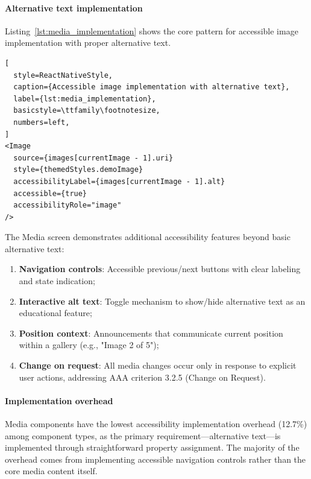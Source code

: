 \paragraph{Alternative text implementation}

Listing~\ref{lst:media_implementation} shows the core pattern for accessible image implementation with proper alternative text.

\begin{lstlisting}[
  style=ReactNativeStyle,
  caption={Accessible image implementation with alternative text},
  label={lst:media_implementation},
  basicstyle=\ttfamily\footnotesize,
  numbers=left,
]
<Image
  source={images[currentImage - 1].uri}
  style={themedStyles.demoImage}
  accessibilityLabel={images[currentImage - 1].alt}
  accessible={true}
  accessibilityRole="image"
/>
\end{lstlisting}
\FloatBarrier

The Media screen demonstrates additional accessibility features beyond basic alternative text:

\begin{enumerate}
    \item \textbf{Navigation controls}: Accessible previous/next buttons with clear labeling and state indication;
    
    \item \textbf{Interactive alt text}: Toggle mechanism to show/hide alternative text as an educational feature;
    
    \item \textbf{Position context}: Announcements that communicate current position within a gallery (e.g., "Image 2 of 5");
    
    \item \textbf{Change on request}: All media changes occur only in response to explicit user actions, addressing AAA criterion 3.2.5 (Change on Request).
\end{enumerate}

\paragraph{Implementation overhead}

Media components have the lowest accessibility implementation overhead (12.7\%) among component types, as the primary requirement—alternative text—is implemented through straightforward property assignment. The majority of the overhead comes from implementing accessible navigation controls rather than the core media content itself.

